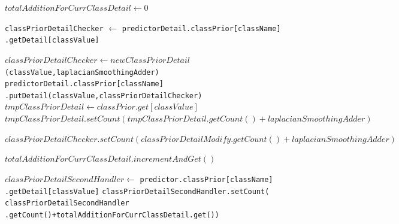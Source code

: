 \begin{enumerate}
\begin{itemize}
\begin{enumerate}
\begin{algorithm}[H]
\begin{algorithmic}[1]

				
					
						\State $totalAdditionForCurrClassDetail \gets 0$
						
							\State \texttt{classPriorDetailChecker} $\gets$ \texttt{predictorDetail.classPrior[className]} \texttt{.getDetail[classValue]}
														
								\State $classPriorDetailChecker \gets new ClassPriorDetail$ \texttt{(classValue,laplacianSmoothingAdder)}
								\State \texttt{predictorDetail.classPrior[className]} \texttt{.putDetail(classValue,classPriorDetailChecker)}
								\State $tmpClassPriorDetail \gets classPrior.get[classValue]$
								\State $tmpClassPriorDetail.setCount(tmpClassPriorDetail.getCount() + laplacianSmoothingAdder)$
								
							\Else
								\State $classPriorDetailChecker .setCount( classPriorDetailModify.getCount() + laplacianSmoothingAdder)$
							\EndIf
							
								\State $totalAdditionForCurrClassDetail.incrementAndGet()$
							\EndFor
							
						\EndFor
						
						\State $classPriorDetailSecondHandler \gets$ \texttt{predictor.classPrior[className]} \texttt{.getDetail[classValue]}
						\State \texttt{classPriorDetailSecondHandler.setCount(}  \texttt{classPriorDetailSecondHandler} \texttt{.getCount()+totalAdditionForCurrClassDetail.get())}
					\EndFor
				
				\EndFor
							
			\EndFor
			
			\end{algorithmic}
			\end{algorithm}
			

		\end{enumerate}						
		
	\end{itemize}


\end{enumerate}
